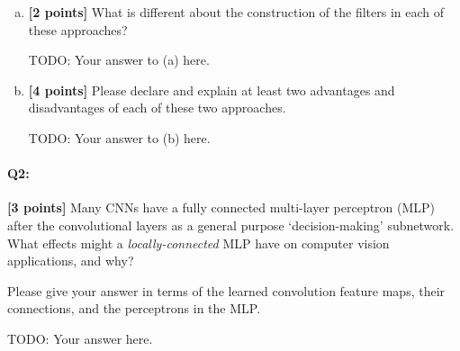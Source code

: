\begin{enumerate} [(a)]
\item \textbf{[2 points]} What is different about the construction of the filters in each of these approaches?

\begin{mdframed}
TODO: Your answer to (a) here.
\end{mdframed}

\item \textbf{[4 points]} Please declare and explain at least two advantages and disadvantages of each of these two approaches.
\begin{mdframed}
TODO: Your answer to (b) here.
\end{mdframed}
\end{enumerate}







\pagebreak
\paragraph{Q2:} \textbf{[3 points]} Many CNNs have a fully connected multi-layer perceptron (MLP) after the convolutional layers as a general purpose `decision-making' subnetwork. 
What effects might a \emph{locally-connected} MLP have on computer vision applications, and why?

Please give your answer in terms of the learned convolution feature maps, their connections, and the perceptrons in the MLP.

\begin{mdframed}
TODO: Your answer here.
\end{mdframed}




